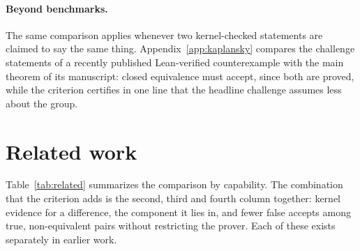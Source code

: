 \documentclass[10pt]{article}
\theoremstyle{definition}
\begin{document}
\paragraph{Beyond benchmarks.} The same comparison applies whenever two kernel-checked
statements are claimed to say the same thing. Appendix~\ref{app:kaplansky} compares the
challenge statements of a recently published Lean-verified counterexample with the main
theorem of its manuscript: closed equivalence must accept, since both are proved, while the
criterion certifies in one line that the headline challenge assumes less about the group.

\section{Related work}\label{sec:related}

Table~\ref{tab:related} summarizes the comparison by capability. The combination that the
criterion adds is the second, third and fourth column together: kernel evidence for a
difference, the component it lies in, and fewer false accepts among true, non-equivalent pairs
without restricting the prover. Each of these exists separately in earlier work.
\end{document}
